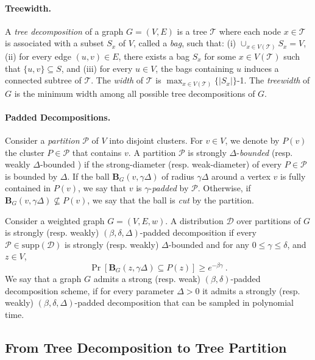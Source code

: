 \documentclass{article}
\newcommand{\supp}{\mathrm{supp}}
\def\ball{\mathbf{B}}
\begin{document}
\paragraph*{Treewidth.} A \emph{tree decomposition} of a graph $G = (V,E)$ is a  tree $\mathcal{T}$ where each node $x\in \mathcal{T}$ is associated with a subset $S_x$ of $V$, called a \emph{bag}, such that: (i) $\cup_{x\in V(\mathcal{T})} S_x = V$, (ii) for every edge $(u,v) \in E$, there exists a bag $S_x$ for some $x\in V(\mathcal{T})$ such that $\{u,v\}\subseteq S$, and (iii) for every $u\in V$, the bags containing $u$ induces a connected subtree of $\mathcal{T}$. The \emph{width} of $\mathcal{T}$ is $\max_{x\in V(\mathcal{T})}\{|S_x|\}$-1. The \emph{treewidth} of $G$ is the minimum width among all possible tree decompositions of $G$. 


\paragraph*{Padded Decompositions.}
Consider a \emph{partition} $\mathcal{P}$ of $V$ into disjoint clusters.
For $v\in V$, we denote by $P(v)$ the cluster $P\in \mathcal{P}$ that contains $v$.
A partition $\mathcal{P}$ is strongly $\Delta$-\emph{bounded} (resp. weakly $\Delta$-bounded ) if the strong-diameter (resp. weak-diameter) of every $P\in\mathcal{P}$ is bounded by $\Delta$.
If the ball $\ball_G(v,\gamma\Delta)$ of radius $\gamma\Delta$ around a vertex $v$ is fully contained in $P(v)$, we say that $v$ is $\gamma$-{\em padded} by $\mathcal{P}$. Otherwise, if $\ball_G(v,\gamma\Delta)\not\subseteq P(v)$, we say that the ball is \emph{cut} by the partition.

\begin{definition}\label{def:PadDecompostion}
	Consider a weighted graph $G=\left(V,E,w\right)$.
	A distribution $\mathcal{D}$ over partitions of $G$ is strongly (resp. weakly) $(\beta,\delta,\Delta)$-padded decomposition if every $\mathcal{P}\in\supp(\mathcal{D})$ is strongly (resp. weakly) $\Delta$-bounded and for any $0\le\gamma\le\delta$, and $z\in V$,
	$$\Pr[\ball_G(z,\gamma\Delta)\subseteq P(z)] \ge e^{-\beta\gamma}~.$$
	We say that a graph $G$ admits a strong (resp. weak) $(\beta,\delta)$-padded decomposition scheme, if for every parameter $\Delta>0$ it admits a strongly (resp. weakly) $(\beta,\delta,\Delta)$-padded decomposition that can be sampled in polynomial time.  
\end{definition}


\subsection{From Tree Decomposition to Tree Partition} \label{sec:tree-partition}
\end{document}

